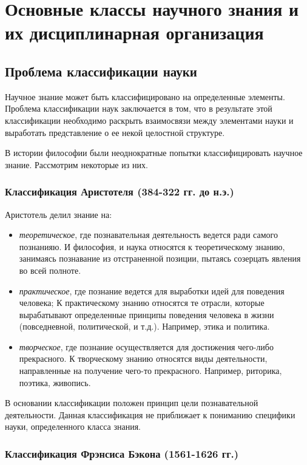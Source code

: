 \section{Основные классы научного знания и их дисциплинарная организация} 

\subsection{Проблема классификации науки}

Научное знание может быть классифицировано на определенные
элементы. Проблема классификации наук заключается в том, что в
результате этой классификации необходимо раскрыть взаимосвязи между элементами
науки и выработать представление о ее некой целостной структуре. 

В истории философии были неоднократные попытки классифицировать научное знание. 
Рассмотрим некоторые из них.

\subsubsection{Классификация Аристотеля (384-322 гг. до н.э.)}

Аристотель делил знание на: 

\begin{itemize}
    \item \textit{теоретическое}, где познавательная деятельность ведется ради самого познанияю. И философия, и наука относятся к теоретическому знанию, занимаясь познавание из
    отстраненной позиции, пытаясь созерцать явления во всей полноте. 
    \item \textit{практическое}, где познание ведется для выработки идей для поведения человека; К практическому знанию относятся те отрасли, которые
    вырабатывают определенные принципы поведения человека в жизни (повседневной, политической, и т.д.). Например, этика и политика.
    \item \textit{творческое}, где познание осуществляется для достижения чего-либо
    прекрасного. К творческому знанию относятся виды деятельности, направленные на
получение чего-то прекрасного. Например, риторика, поэтика, живопись.
\end{itemize}

В основании классификации положен принцип цели
познавательной деятельности. Данная классификация не приближает к
пониманию специфики науки, определенного класса знания. 

\subsubsection{Классификация Фрэнсиса Бэкона (1561-1626 гг.)}

